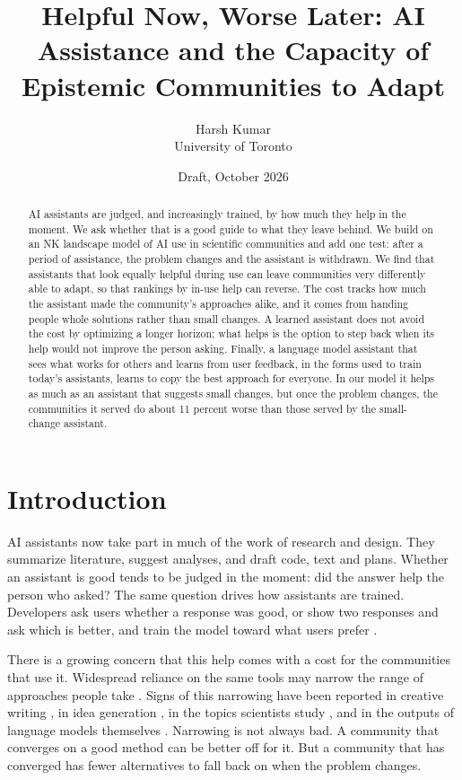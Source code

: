 \documentclass[11pt]{article}
\title{Helpful Now, Worse Later: AI Assistance and the Capacity of Epistemic Communities to Adapt}
\author{Harsh Kumar\\University of Toronto}
\date{Draft, October 2026}
\begin{document}
\maketitle

\begin{abstract}
AI assistants are judged, and increasingly trained, by how much they help in the moment. We ask whether that is a good guide to what they leave behind. We build on an NK landscape model of AI use in scientific communities and add one test: after a period of assistance, the problem changes and the assistant is withdrawn. We find that assistants that look equally helpful during use can leave communities very differently able to adapt, so that rankings by in-use help can reverse. The cost tracks how much the assistant made the community's approaches alike, and it comes from handing people whole solutions rather than small changes. A learned assistant does not avoid the cost by optimizing a longer horizon; what helps is the option to step back when its help would not improve the person asking. Finally, a language model assistant that sees what works for others and learns from user feedback, in the forms used to train today's assistants, learns to copy the best approach for everyone. In our model it helps as much as an assistant that suggests small changes, but once the problem changes, the communities it served do about 11 percent worse than those served by the small-change assistant.
\end{abstract}

\section{Introduction}
\label{sec:intro}

AI assistants now take part in much of the work of research and design. They summarize literature, suggest analyses, and draft code, text and plans. Whether an assistant is good tends to be judged in the moment: did the answer help the person who asked? The same question drives how assistants are trained. Developers ask users whether a response was good, or show two responses and ask which is better, and train the model toward what users prefer \citep{christiano2017deep,ouyang2022training,rafailov2023direct}.

There is a growing concern that this help comes with a cost for the communities that use it. Widespread reliance on the same tools may narrow the range of approaches people take \citep{messeri2024artificial,kleinberg2021algorithmic,burton2024large}. Signs of this narrowing have been reported in creative writing \citep{doshi2024generative}, in idea generation \citep{kumar2025human}, in the topics scientists study \citep{hao2026artificial}, and in the outputs of language models themselves \citep{jiang2025artificial}. Narrowing is not always bad. A community that converges on a good method can be better off for it. But a community that has converged has fewer alternatives to fall back on when the problem changes.
\end{document}
